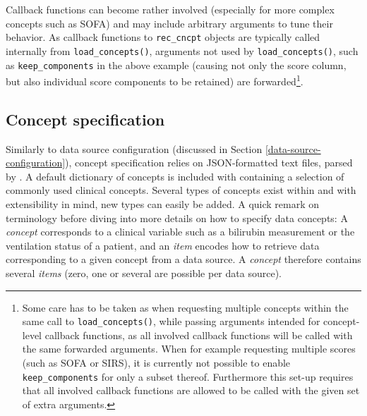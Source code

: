\documentclass[
  notitle]{jss}
\begin{document}
Callback functions can become rather involved (especially for more
complex concepts such as SOFA) and may include arbitrary arguments to
tune their behavior. As callback functions to \texttt{rec\_cncpt}
objects are typically called internally from \texttt{load\_concepts()},
arguments not used by \texttt{load\_concepts()}, such as
\texttt{keep\_components} in the above example (causing not only the
score column, but also individual score components to be retained) are
forwarded\footnote{Some care has to be taken as when requesting multiple
  concepts within the same call to \texttt{load\_concepts()}, while
  passing arguments intended for concept-level callback functions, as
  all involved callback functions will be called with the same forwarded
  arguments. When for example requesting multiple scores (such as SOFA
  or SIRS), it is currently not possible to enable
  \texttt{keep\_components} for only a subset thereof. Furthermore this
  set-up requires that all involved callback functions are allowed to be
  called with the given set of extra arguments.}.

\hypertarget{concept-specification}{%
\subsection{Concept specification}\label{concept-specification}}

Similarly to data source configuration (discussed in Section
\ref{data-source-configuration}), concept specification relies on
JSON-formatted text files, parsed by  \citep{ooms2014}. A
default dictionary of concepts is included with  containing a
selection of commonly used clinical concepts. Several types of concepts
exist within  and with extensibility in mind, new types can
easily be added. A quick remark on terminology before diving into more
details on how to specify data concepts: A \emph{concept} corresponds to
a clinical variable such as a bilirubin measurement or the ventilation
status of a patient, and an \emph{item} encodes how to retrieve data
corresponding to a given concept from a data source. A \emph{concept}
therefore contains several \emph{items} (zero, one or several are
possible per data source).
\end{document}
